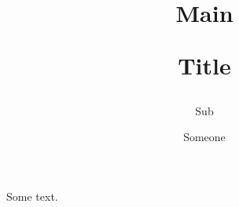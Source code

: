 \documentclass{scrartcl}
\title{Main\par Title}
\subtitle{Sub}
\author{Someone}
\begin{document}
\maketitle
Some text.
\end{document}
